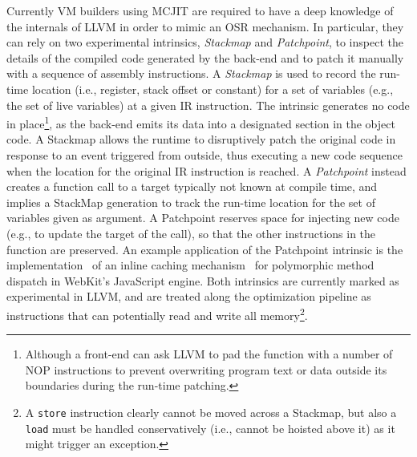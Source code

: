 Currently VM builders using MCJIT are required to have a deep knowledge of the internals of LLVM in order to mimic an OSR mechanism. In particular, they can rely on two experimental intrinsics, {\em Stackmap} and {\em Patchpoint}, to inspect the details of the compiled code generated by the back-end and to patch it manually with a sequence of assembly instructions. A {\em Stackmap} is used to record the run-time location (i.e., register, stack offset or constant) for a set of variables (e.g., the set of live variables) at a given IR instruction. The intrinsic generates no code in place\footnote{Although a front-end can ask LLVM to pad the function with a number of NOP instructions to prevent overwriting program text or data outside its boundaries during the run-time patching.}, as the back-end emits its data into a designated section in the object code. A Stackmap allows the runtime to disruptively patch the original code in response to an event triggered from outside, thus executing a new code sequence when the location for the original IR instruction is reached. A {\em Patchpoint} instead creates a function call to a target typically not known at compile time, and implies a StackMap generation to track the run-time location for the set of variables given as argument. A Patchpoint reserves space for injecting new code (e.g., to update the target of the call), so that the other instructions in the function are preserved. An example application of the Patchpoint intrinsic is the implementation~\cite{Pizlo14} of an inline caching mechanism~\cite{Deutsch84} for polymorphic method dispatch in WebKit's JavaScript engine. Both intrinsics are currently marked as experimental in LLVM, and are treated along the optimization pipeline as instructions that can potentially read and write all memory\footnote{A {\tt store} instruction clearly cannot be moved across a Stackmap, but also a {\tt load} must be handled conservatively (i.e., cannot be hoisted above it) as it might trigger an exception.}.




